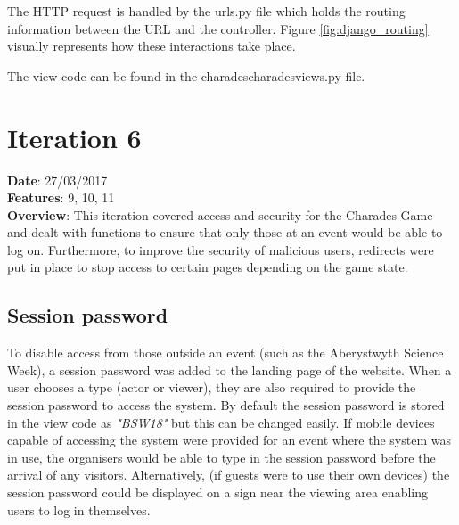 The HTTP request is handled by the urls.py file which holds the routing information between the URL and the controller. Figure \ref{fig:django_routing} visually represents how these interactions take place.

The view code can be found in the \/charades\/charades\/views.py file.

\begin{figure}[h!]
\end{figure}


\newpage

\section{Iteration 6}
\textbf{Date}: 27/03/2017 \\
\textbf{Features}: 9, 10, 11 \\
\textbf{Overview}: This iteration covered access and security for the Charades Game and dealt with functions to ensure that only those at an event would be able to log on. Furthermore, to improve the security of malicious users, redirects were put in place to stop access to certain pages depending on the game state.

\subsection{Session password}
To disable access from those outside an event (such as the Aberystwyth Science Week), a session password was added to the landing page of the website. When a user chooses a type (actor or viewer), they are also required to provide the session password to access the system. By default the session password is stored in the view code as \textit{"BSW18"} but this can be changed easily. If mobile devices capable of accessing the system were provided for an event where the system was in use, the organisers would be able to type in the session password before the arrival of any visitors. Alternatively, (if guests were to use their own devices) the session password could be displayed on a sign near the viewing area enabling users to log in themselves.

